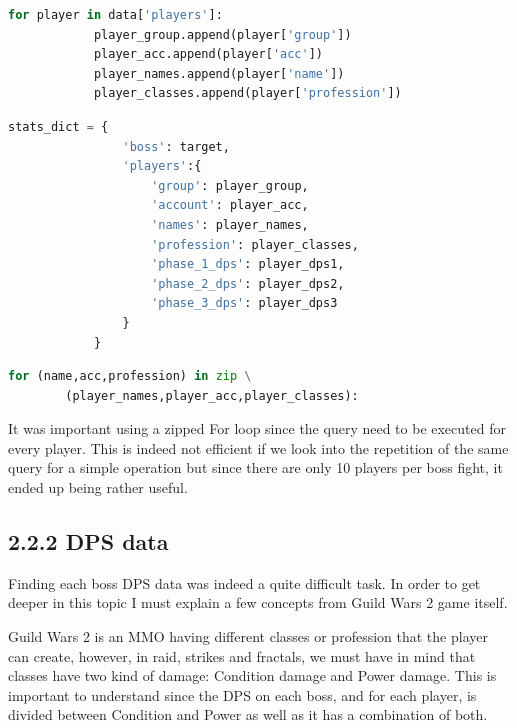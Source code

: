 \documentclass[12pt,a4paper]{article}
\begin{document}
    \begin{lstlisting}[language=Python, caption={\textbf{Basic player data loop}},captionpos=!b]
        for player in data['players']:
            player_group.append(player['group'])
            player_acc.append(player['acc'])
            player_names.append(player['name'])
            player_classes.append(player['profession'])
    \end{lstlisting}
    \begin{lstlisting}[language=Python, caption={\textbf{Custom Python stat dictionary}},captionpos=!b]
        stats_dict = {
                'boss': target,
                'players':{
                    'group': player_group,
                    'account': player_acc,
                    'names': player_names,
                    'profession': player_classes,
                    'phase_1_dps': player_dps1,
                    'phase_2_dps': player_dps2,
                    'phase_3_dps': player_dps3
                }
            }
    \end{lstlisting}
    
    \begin{lstlisting}[language=Python, caption={\textbf{Zipped data for SQLite query}},captionpos=!b]
        for (name,acc,profession) in zip \
        (player_names,player_acc,player_classes):
    \end{lstlisting}

    It was important using a zipped For loop since the query need to be executed for every player.
    This is indeed not efficient if we look into the repetition of the same query for a simple operation
    but since there are only 10 players per boss fight, it ended up being rather useful.

    \newpage

    \subsection*{\normalsize 2.2.2 DPS data}
    Finding each boss DPS data was indeed a quite difficult task. In order to get deeper in this topic
    I must explain a few concepts from Guild Wars 2 game itself.

    Guild Wars 2 is an MMO having different classes or profession that the player can create, however, in
    raid, strikes and fractals, we must have in mind that classes have two kind of damage: Condition damage
    and Power damage. This is important to understand since the DPS on each boss, and for each player, is divided
    between Condition and Power as well as it has a combination of both.
\end{document}
